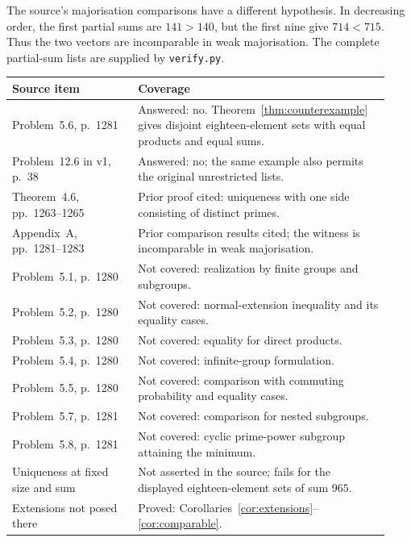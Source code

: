 \documentclass[11pt]{article}
\begin{document}
The source's majorisation comparisons \cite[Appendix~A, pp.~1281--1283]{ALM}
have a different hypothesis. In decreasing order, the first partial sums
are $141>140$, but the first nine give $714<715$. Thus the two vectors
are incomparable in weak majorisation. The complete partial-sum lists are
supplied by \texttt{verify.py}.

\begin{center}
\small
\begin{tabular}{@{}>{\raggedright\arraybackslash}p{0.31\linewidth}>{\raggedright\arraybackslash}p{0.62\linewidth}@{}}
\toprule
Source item & Coverage\\
\midrule
Problem~5.6, p.~1281 & Answered: no. Theorem~\ref{thm:counterexample} gives disjoint eighteen-element sets with equal products and equal sums.\\
Problem~12.6 in v1, p.~38 & Answered: no; the same example also permits the original unrestricted lists.\\
Theorem~4.6, pp.~1263--1265 & Prior proof cited: uniqueness with one side consisting of distinct primes.\\
Appendix~A, pp.~1281--1283 & Prior comparison results cited; the witness is incomparable in weak majorisation.\\
Problem~5.1, p.~1280 & Not covered: realization by finite groups and subgroups.\\
Problem~5.2, p.~1280 & Not covered: normal-extension inequality and its equality cases.\\
Problem~5.3, p.~1280 & Not covered: equality for direct products.\\
Problem~5.4, p.~1280 & Not covered: infinite-group formulation.\\
Problem~5.5, p.~1280 & Not covered: comparison with commuting probability and equality cases.\\
Problem~5.7, p.~1281 & Not covered: comparison for nested subgroups.\\
Problem~5.8, p.~1281 & Not covered: cyclic prime-power subgroup attaining the minimum.\\
Uniqueness at fixed size and sum & Not asserted in the source; fails for the displayed eighteen-element sets of sum $965$.\\
Extensions not posed there & Proved: Corollaries~\ref{cor:extensions}--\ref{cor:comparable}.\\
\bottomrule
\end{tabular}
\end{center}
\end{document}
